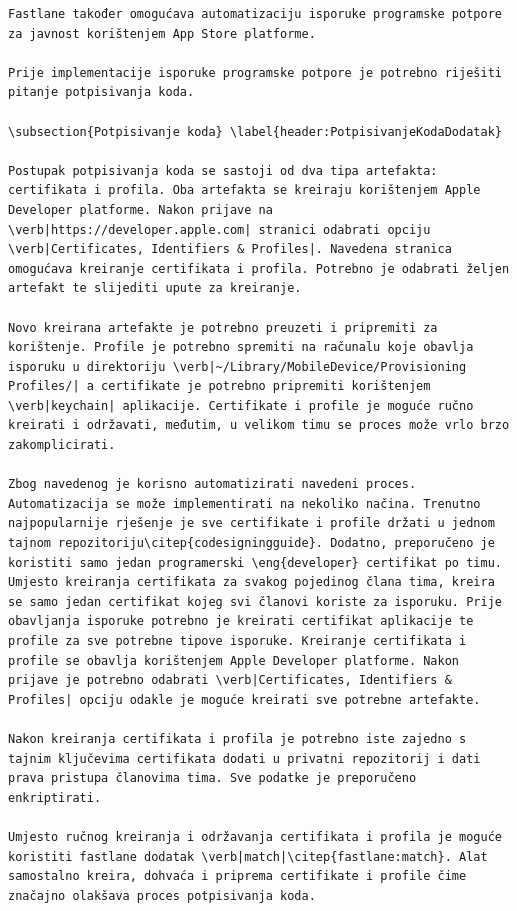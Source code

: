 \documentclass[times, utf8, diplomski, numeric]{fer}
\newcommand{\eng}[1]{(engl. \textit{#1})}
\begin{document}
\begin{appendices}
\begin{lstlisting}[caption=Provjera postojanja i pokretanje Swiftlint alata, label=listing:swiftlint]
Fastlane također omogućava automatizaciju isporuke programske potpore za javnost korištenjem App Store platforme.

Prije implementacije isporuke programske potpore je potrebno riješiti pitanje potpisivanja koda.

\subsection{Potpisivanje koda} \label{header:PotpisivanjeKodaDodatak}

Postupak potpisivanja koda se sastoji od dva tipa artefakta: certifikata i profila. Oba artefakta se kreiraju korištenjem Apple Developer platforme. Nakon prijave na \verb|https://developer.apple.com| stranici odabrati opciju \verb|Certificates, Identifiers & Profiles|. Navedena stranica omogućava kreiranje certifikata i profila. Potrebno je odabrati željen artefakt te slijediti upute za kreiranje.

Novo kreirana artefakte je potrebno preuzeti i pripremiti za korištenje. Profile je potrebno spremiti na računalu koje obavlja isporuku u direktoriju \verb|~/Library/MobileDevice/Provisioning Profiles/| a certifikate je potrebno pripremiti korištenjem \verb|keychain| aplikacije. Certifikate i profile je moguće ručno kreirati i održavati, međutim, u velikom timu se proces može vrlo brzo zakomplicirati.

Zbog navedenog je korisno automatizirati navedeni proces. Automatizacija se može implementirati na nekoliko načina. Trenutno najpopularnije rješenje je sve certifikate i profile držati u jednom tajnom repozitoriju\citep{codesigningguide}. Dodatno, preporučeno je koristiti samo jedan programerski \eng{developer} certifikat po timu. Umjesto kreiranja certifikata za svakog pojedinog člana tima, kreira se samo jedan certifikat kojeg svi članovi koriste za isporuku. Prije obavljanja isporuke potrebno je kreirati certifikat aplikacije te profile za sve potrebne tipove isporuke. Kreiranje certifikata i profile se obavlja korištenjem Apple Developer platforme. Nakon prijave je potrebno odabrati \verb|Certificates, Identifiers & Profiles| opciju odakle je moguće kreirati sve potrebne artefakte.

Nakon kreiranja certifikata i profila je potrebno iste zajedno s tajnim ključevima certifikata dodati u privatni repozitorij i dati prava pristupa članovima tima. Sve podatke je preporučeno enkriptirati.

Umjesto ručnog kreiranja i održavanja certifikata i profila je moguće koristiti fastlane dodatak \verb|match|\citep{fastlane:match}. Alat samostalno kreira, dohvaća i priprema certifikate i profile čime značajno olakšava proces potpisivanja koda.


\end{lstlisting}
\end{appendices}
\end{document}
